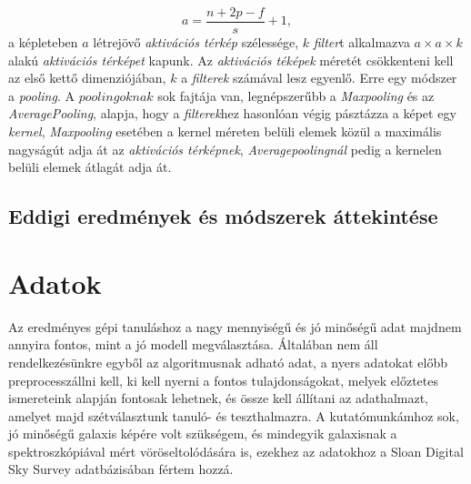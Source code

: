\documentclass[12pt,letterpaper,twoside,openright]{book}
\begin{document}
\begin{equation}
a = \frac{n+2p-f}{s} +1,
\end{equation}
a képleteben $a$ létrejövő \textit{aktivációs térkép} szélessége, $k$ \textit{filter}t alkalmazva $a\times a\times k$ alakú \textit{aktivációs térképet} kapunk. Az \textit{aktivációs téképek} méretét csökkenteni kell az első kettő dimenziójában, $k$ a \textit{filterek} számával lesz egyenlő. Erre egy módszer a \textit{pooling}. A $poolingoknak$ sok fajtája van, legnépszerűbb a \textit{Maxpooling} és az \textit{AveragePooling}, alapja, hogy a \textit{filterek}hez hasonlóan végig pásztázza a képet egy \textit{kernel},  \textit{Maxpooling} esetében a kernel méreten belüli elemek közül a maximális nagyságút adja át az \textit{aktivációs térképnek}, \textit{Averagepoolingnál} pedig a kernelen belüli elemek átlagát adja át.
\section{Eddigi eredmények és módszerek áttekintése}


 \chapter{Adatok}
 Az eredményes gépi tanuláshoz a nagy mennyiségű és jó minőségű adat majdnem annyira fontos, mint a jó modell megválasztása. Általában nem áll  rendelkezésünkre egyből az algoritmusnak adható adat, a nyers adatokat előbb preprocesszállni kell, ki kell nyerni a fontos tulajdonságokat, melyek előztetes ismereteink alapján fontosak lehetnek, és össze kell állítani az adathalmazt, amelyet majd  szétválasztunk tanuló- és teszthalmazra. 
 \newline \indent 
 A kutatómunkámhoz sok, jó minőségű galaxis képére volt szükségem, és mindegyik galaxisnak a spektroszkópiával mért vöröseltolódására is, ezekhez az adatokhoz a Sloan Digital Sky Survey adatbázisában fértem hozzá.
 
\end{document}
